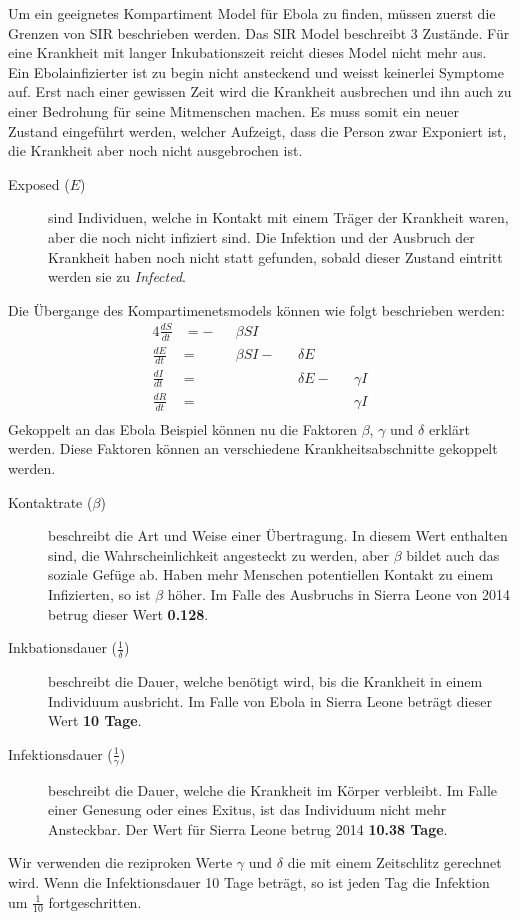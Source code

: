 \begin{refsection}
Um ein geeignetes Kompartiment Model für Ebola zu finden, müssen zuerst die Grenzen von SIR beschrieben werden. Das SIR Model beschreibt 3 Zustände. Für eine Krankheit mit langer Inkubationszeit reicht dieses Model nicht mehr aus. Ein Ebolainfizierter ist zu begin nicht ansteckend und weisst keinerlei Symptome auf. Erst nach einer gewissen Zeit wird die Krankheit ausbrechen und ihn auch zu einer Bedrohung für seine Mitmenschen machen. Es muss somit ein neuer Zustand eingeführt werden, welcher Aufzeigt, dass die Person zwar Exponiert ist, die Krankheit aber noch nicht ausgebrochen ist.
\begin{figure}[H]
  \centering
  
\end{figure}
\begin{description}
  \item [Exposed ($E$)] sind Individuen, welche in Kontakt mit einem Träger der Krankheit waren, aber die noch nicht infiziert sind. Die Infektion und der Ausbruch der Krankheit haben noch nicht statt gefunden, sobald dieser Zustand eintritt werden sie zu \emph{Infected}.
\end{description}
Die Übergange des Kompartimenetsmodels können wie folgt beschrieben werden:
 \begin{alignat*}{4}
   \frac{dS}{dt} & = - &   & \beta S I & & \\
   \frac{dE}{dt} & =   &   & \beta S I - &   & \delta E & & \\
   \frac{dI}{dt} & =   &   &  &   & \delta E - & & \gamma I \\
   \frac{dR}{dt} & =   &   &  &   &  & & \gamma I \\
 \end{alignat*}
Gekoppelt an das Ebola Beispiel können nu die Faktoren $\beta$, $\gamma$ und $\delta$ erklärt werden. Diese Faktoren können an verschiedene Krankheitsabschnitte gekoppelt werden.
\begin{description}
  \item [Kontaktrate ($\beta$)] beschreibt die Art und Weise einer Übertragung. In diesem Wert enthalten sind, die Wahrscheinlichkeit angesteckt zu werden, aber $\beta$ bildet auch das soziale Gefüge ab. Haben mehr Menschen potentiellen Kontakt zu einem Infizierten, so ist $\beta$ höher. Im Falle des Ausbruchs in Sierra Leone von 2014 betrug dieser Wert \textbf{0.128}.
  \item [Inkbationsdauer ($\frac{1}{\delta}$)] beschreibt die Dauer, welche benötigt wird, bis die Krankheit in einem Individuum ausbricht. Im Falle von Ebola in Sierra Leone beträgt dieser Wert \textbf{10 Tage}.
  \item [Infektionsdauer ($\frac{1}{\gamma}$)] beschreibt die Dauer, welche die Krankheit im Körper verbleibt. Im Falle einer Genesung oder eines Exitus, ist das Individuum nicht mehr Ansteckbar. Der Wert für Sierra Leone betrug 2014 \textbf{10.38 Tage}.
\end{description}
Wir verwenden die reziproken Werte $\gamma$ und $\delta$ die mit einem Zeitschlitz gerechnet wird. Wenn die Infektionsdauer 10 Tage beträgt, so ist jeden Tag die Infektion um $\frac{1}{10}$ fortgeschritten.


\end{refsection}
